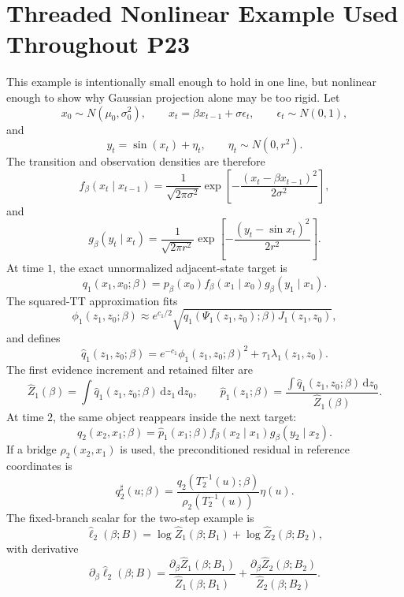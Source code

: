 \documentclass[11pt]{article}
\newcommand{\dd}{\,\mathrm d}
\begin{document}
\section{Threaded Nonlinear Example Used Throughout P23}

This example is intentionally small enough to hold in one line, but nonlinear
enough to show why Gaussian projection alone may be too rigid.  Let
\[
    x_0\sim N(\mu_0,\sigma_0^2),
    \qquad
    x_t=\beta x_{t-1}+\sigma\epsilon_t,
    \qquad
    \epsilon_t\sim N(0,1),
    \tag{P23-E1}
\]
and
\[
    y_t=\sin(x_t)+\eta_t,
    \qquad
    \eta_t\sim N(0,r^2).
    \tag{P23-E2}
\]
The transition and observation densities are therefore
\[
    f_\beta(x_t\mid x_{t-1})
    =
    \frac{1}{\sqrt{2\pi\sigma^2}}
    \exp\!\left[-\frac{(x_t-\beta x_{t-1})^2}{2\sigma^2}\right],
    \tag{P23-E3}
\]
and
\[
    g_\beta(y_t\mid x_t)
    =
    \frac{1}{\sqrt{2\pi r^2}}
    \exp\!\left[-\frac{(y_t-\sin x_t)^2}{2r^2}\right].
    \tag{P23-E4}
\]
At time \(1\), the exact unnormalized adjacent-state target is
\[
    q_1(x_1,x_0;\beta)
    =
    p_\beta(x_0)
    f_\beta(x_1\mid x_0)
    g_\beta(y_1\mid x_1).
    \tag{P23-E5}
\]
The squared-TT approximation fits
\[
    \phi_1(z_1,z_0;\beta)
    \approx
    e^{c_1/2}
    \sqrt{
    q_1(\Psi_1(z_1,z_0);\beta)
    J_1(z_1,z_0)},
    \tag{P23-E6}
\]
and defines
\[
    \widehat q_1(z_1,z_0;\beta)
    =
    e^{-c_1}\phi_1(z_1,z_0;\beta)^2
    +
    \tau_1\lambda_1(z_1,z_0).
    \tag{P23-E7}
\]
The first evidence increment and retained filter are
\[
    \widehat Z_1(\beta)
    =
    \int\widehat q_1(z_1,z_0;\beta)\dd z_1\dd z_0,
    \qquad
    \widehat p_1(z_1;\beta)
    =
    \frac{\int\widehat q_1(z_1,z_0;\beta)\dd z_0}
    {\widehat Z_1(\beta)}.
    \tag{P23-E8}
\]
At time \(2\), the same object reappears inside the next target:
\[
    q_2(x_2,x_1;\beta)
    =
    \widehat p_1(x_1;\beta)
    f_\beta(x_2\mid x_1)
    g_\beta(y_2\mid x_2).
    \tag{P23-E9}
\]
If a bridge \(\rho_2(x_2,x_1)\) is used, the preconditioned residual in
reference coordinates is
\[
    q_2^\sharp(u;\beta)
    =
    \frac{q_2(T_2^{-1}(u);\beta)}
    {\rho_2(T_2^{-1}(u))}
    \eta(u).
    \tag{P23-E10}
\]
The fixed-branch scalar for the two-step example is
\[
    \widehat\ell_2(\beta;B)
    =
    \log\widehat Z_1(\beta;B_1)
    +
    \log\widehat Z_2(\beta;B_2),
    \tag{P23-E11}
\]
with derivative
\[
    \partial_\beta\widehat\ell_2(\beta;B)
    =
    \frac{\partial_\beta\widehat Z_1(\beta;B_1)}
    {\widehat Z_1(\beta;B_1)}
    +
    \frac{\partial_\beta\widehat Z_2(\beta;B_2)}
    {\widehat Z_2(\beta;B_2)}.
    \tag{P23-E12}
\]
\end{document}
